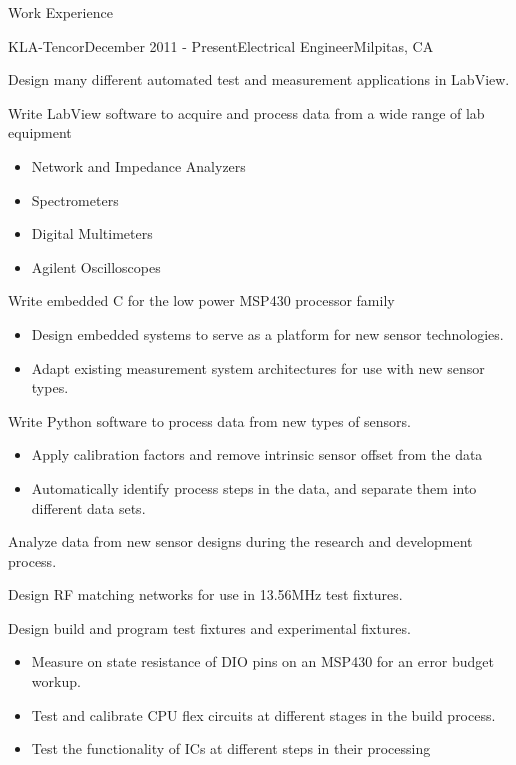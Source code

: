 \documentclass{resume} %
\begin{document}
\begin{rSection}{Work Experience}

\begin{rSubsection}{KLA-Tencor}{December 2011 - Present}{Electrical Engineer}{Milpitas, CA}
\smallskip
\item Design many different automated test and measurement applications in LabView.

\item Write LabView software to acquire and process data from a wide range of lab equipment
\begin{itemize}
\itemsep -0.5em \vspace{-0.5em}
\renewcommand{\labelitemi}{-}
\item Network and Impedance Analyzers
\item Spectrometers
\item Digital Multimeters
\item Agilent Oscilloscopes 
\end{itemize}

\item Write embedded C for the low power MSP430 processor family
\begin{itemize}
\itemsep -0.5em \vspace{-0.5em}
\renewcommand{\labelitemi}{-}
\item Design embedded systems to serve as a platform for new sensor technologies.
\item Adapt existing measurement system architectures for use with new sensor types.
\end{itemize}
\item Write Python software to process data from new types of sensors.
\begin{itemize}
\itemsep -0.5em \vspace{-0.5em}
\renewcommand{\labelitemi}{-}
\item Apply calibration factors and remove intrinsic sensor offset from the data
\item Automatically identify process steps in the data, and separate them into different data sets.
\end{itemize}
\item Analyze data from new sensor designs during the research and development process.
\item Design RF matching networks for use in 13.56MHz test fixtures.
\item Design build and program test fixtures and experimental fixtures.
\begin{itemize}
\itemsep -0.5em \vspace{-0.5em}
\renewcommand{\labelitemi}{-}
\item Measure on state resistance of DIO pins on an MSP430 for an error budget workup.
\item Test and calibrate CPU flex circuits at different stages in the build process.
\item Test the functionality of ICs at different steps in their processing 
\end{itemize}
\end{rSubsection}


\end{rSection}
\end{document}
